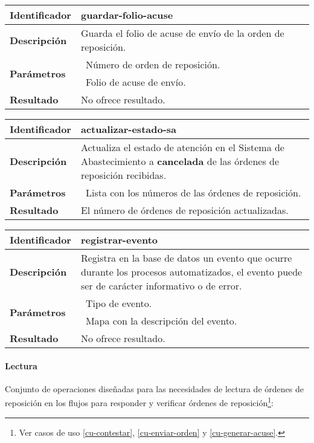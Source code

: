 	\begin{longtable}{|p{}|p{}|}
		\hline
		\textbf{Identificador}	& \textbf{guardar-folio-acuse}\\
		\hline
		\hline
		\textbf{Descripción}	& Guarda el folio de acuse de envío de la orden de reposición.\\
		\hline
		\multirow{2}{*}{\textbf{Parámetros}} 	& \textbullet\, Número de orden de reposición.\\
												& \textbullet\, Folio de acuse de envío.\\
		\hline
		\textbf{Resultado}		& No ofrece resultado.\\
		\hline
	\end{longtable}

	\begin{longtable}{|p{}|p{}|}
		\hline
		\textbf{Identificador}	& \textbf{actualizar-estado-sa}\\
		\hline
		\hline
		\textbf{Descripción}	& Actualiza el estado de atención en el Sistema de Abastecimiento a \textbf{cancelada} de las órdenes de reposición recibidas.\\
		\hline
		\textbf{Parámetros} 	& \textbullet\, Lista con los números de las órdenes de reposición.\\
		\hline
		\textbf{Resultado}		& El número de órdenes de reposición actualizadas.\\
		\hline
	\end{longtable}

	\begin{longtable}{|p{}|p{}|}
		\hline
		\textbf{Identificador}	& \textbf{registrar-evento}\\
		\hline
		\hline
		\textbf{Descripción}	& Registra en la base de datos un evento que ocurre durante los procesos automatizados, el evento puede ser de carácter informativo o de error.\\
		\hline
		\multirow{2}{*}{\textbf{Parámetros}}	& \textbullet\, Tipo de evento.\\
												& \textbullet\, Mapa con la descripción del evento.\\
		\hline
		\textbf{Resultado}		& No ofrece resultado.\\
		\hline
	\end{longtable}

\paragraph{Lectura\\}
Conjunto de operaciones diseñadas para las necesidades de lectura de órdenes de reposición en los flujos para responder y verificar órdenes de reposición\footnote{Ver casos de uso \ref{cu-contestar}, \ref{cu-enviar-orden} y \ref{cu-generar-acuse}.}:

